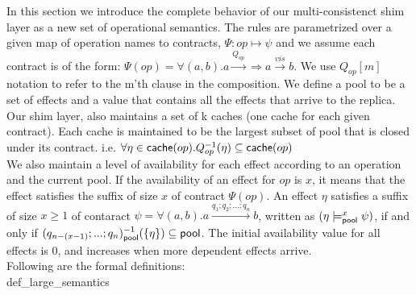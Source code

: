 In this section we introduce the complete behavior of our multi-consistenct shim layer as a new set of operational semantics. 
The rules are parametrized over a given map of operation names to
contracts, $\Psi :  op
\mapsto \psi $ and we assume each contract is of the form:
$\Psi(op)=\forall (a,b). a \xrightarrow{Q_{op}} \Rightarrow a \xrightarrow{vis} b.$ 
We use $Q_{op}[m]$ notation to refer to the m'th clause in the composition.
We define a pool to be a set of effects and a value that contains all
the effects that arrive to the replica. 
Our shim layer, also maintains a set of k caches (one cache for each
given contract). Each cache is maintained to be the largest
subset of pool that is closed under its
contract.  i.e. $\forall \eta \in {\normalfont \textsf{cache}}(op). Q_{op}^{-1}(\eta)
\subseteq {\normalfont \textsf{cache}}(op) $ 
\\We also maintain a level of availability for each effect
according to an operation and the current pool. If the availability of an effect for
$op$ is $x$, it means
that the effect satisfies the suffix of size $x$ of contract $\Psi(op)$.
An effect $\eta$ satisfies a suffix of size $x\geq 1$ of contaract
$\psi=\forall (a,b). a \xrightarrow{q_1;q_2;...;q_n} b$,
written as $ (\eta \models_{{\normalfont \textsf{pool}}}^{x} \psi )$, if and only if
$(q_{n-(x-1)};...;q_{n} )^{-1}_{{\normalfont \textsf{pool}}}(\{\eta\}) \subseteq {\normalfont \textsf{pool}}$. The
initial availability value for all effects is 0, and increases when more
dependent effects arrive. 
\\
Following are the formal definitions: 
\\
 {def_large_semantics}



